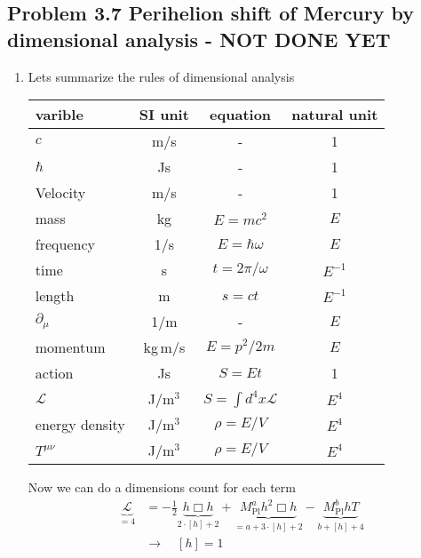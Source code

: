 \documentclass[../main.tex]{subfiles}
\begin{document}
\subsection{Problem 3.7 Perihelion shift of Mercury by dimensional analysis - NOT DONE YET}
\begin{enumerate}[label=(\alph*)]
\item Lets summarize the rules of dimensional analysis 

\begin{center}
\begin{tabular}{ lccc } 
 \hline
 varible & SI unit &equation & natural unit \\ 
 \hline\hline
 $c$               & m/s    & -                        & 1        \\
 $\hbar$           & Js     & -                        & 1        \\
 Velocity          & m/s    & -                        & 1      \\
 mass              & kg     & $E=mc^2$                 & $E$      \\
 frequency         & 1/s    & $E=\hbar\omega$          & $E$      \\
 time              & s      & $t=2\pi/\omega$          & $E^{-1}$ \\
 length            & m      & $s=ct$                   & $E^{-1}$ \\
 $\partial_\mu$    & 1/m    & -                        & $E$      \\
 momentum          & kg\,m/s& $E=p^2/2m$               & $E$      \\
 action            & Js     & $S=Et$                   & 1        \\
 $\mathcal{L}$     & J/m$^3$& $S=\int d^4x\mathcal{L}$ & $E^4$    \\
 energy density    & J/m$^3$& $\rho=E/V$               & $E^4$    \\
 $T^{\mu\nu}$      & J/m$^3$& $\rho=E/V$               & $E^4$    \\
 \hline
\end{tabular}
\end{center}
Now we can do a dimensions count for each term
\begin{align}
\underbrace{\mathcal{L}}_{=4}&=-\frac{1}{2}\underbrace{h\Box h}_{2\cdot[h]+2}+ \underbrace{M_\text{Pl}^a h^2\Box h}_{=a+3\cdot[h]+2}-\underbrace{M_\text{Pl}^bhT}_{b+[h]+4}\\
&\rightarrow\quad[h]=1\\

\end{align}
\end{enumerate}
\end{document}
